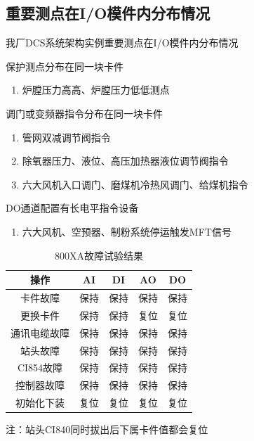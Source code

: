 \documentclass[12pt,hyperref={CJKbookmarks=true}]{beamer} %
\begin{document}
\subsection{重要测点在I/O模件内分布情况}

\begin{frame}{我厂DCS系统架构实例}{重要测点在I/O模件内分布情况}
\begin{alertblock}{\heiti 保护测点分布在同一块卡件}
			\begin{enumerate}
				\item  炉膛压力高高、炉膛压力低低测点
			
		\end{enumerate}
		\end{alertblock}
\pause
\begin{alertblock}{\heiti 调门或变频器指令分布在同一块卡件}
			\begin{enumerate}
				\item  管网双减调节阀指令
				\item  除氧器压力、液位、高压加热器液位调节阀指令
				\item 六大风机入口调门、磨煤机冷热风调门、给煤机指令
			
		\end{enumerate}
		\end{alertblock}
\begin{alertblock}{\heiti DO通道配置有长电平指令设备}
			\begin{enumerate}
				\item  六大风机、空预器、制粉系统停运触发MFT信号
			
		\end{enumerate}
		\end{alertblock}
\end{frame}
\begin{frame}

\begin{table}
	\caption{800XA故障试验结果}
	\begin{tabular}{|c|c|c|c|c|}
		\hline
		       操作    & AI         & DI     & AO&DO  \\   \hline
		卡件故障    & 保持        & 保持      & 保持&保持  \\  \hline 
		更换卡件    & 保持    & 保持   & 复位&复位\\  \hline  
		通讯电缆故障    & 保持        & 保持      & 保持& 保持 \\   \hline  
		站头故障    &保持          & 保持       & 保持& 保持 \\     \hline
CI854故障    &保持          & 保持       & 保持& 保持 \\     \hline
控制器故障    &保持          & 保持       & 保持& 保持 \\     \hline
初始化下装    &复位          & 复位       & 复位& 复位 \\     \hline
	\end{tabular}
	\end{table}
注：站头CI840同时拔出后下属卡件值都会复位


\end{frame}
\end{document}

